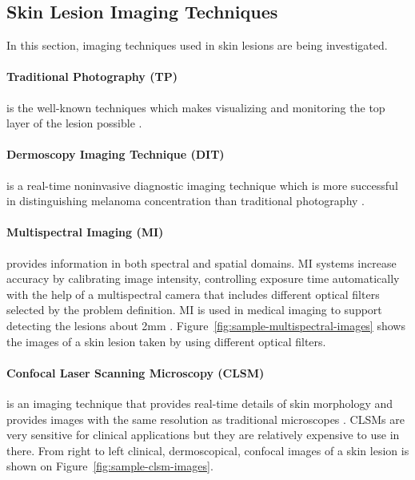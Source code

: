         

    \subsection{Skin Lesion Imaging Techniques}

        In this section, imaging techniques used in skin lesions are being investigated.

        \paragraph{Traditional Photography (TP)} is the well-known techniques which makes visualizing and monitoring the top layer of the lesion possible \cite{feit2004melanomas}.

        \paragraph{Dermoscopy Imaging Technique (DIT)}  is a real-time noninvasive diagnostic imaging technique
            which is more successful in distinguishing melanoma concentration than traditional photography \cite{aljanabi2019various}.

        \paragraph{Multispectral Imaging (MI)} provides information in both spectral and spatial domains.
            MI systems increase accuracy by calibrating image intensity,
            controlling exposure time automatically with the help of a multispectral camera that includes different optical filters selected by the problem definition.
            MI is used in medical imaging to support  detecting the lesions about 2mm \cite{aljanabi2019various}.
            Figure~\ref{fig:sample-multispectral-images} shows the images of a skin lesion taken by using different optical filters.

            

        \paragraph{Confocal Laser Scanning Microscopy (CLSM)} is an imaging technique that provides real-time details of skin morphology
            and provides images with the same resolution as traditional microscopes \cite{gerger2005diagnostic}.
            CLSMs are very sensitive for clinical applications but they are relatively expensive to use in there.
            From right to left clinical, dermoscopical, confocal images of a skin lesion is shown on Figure~\ref{fig:sample-clsm-images}.

